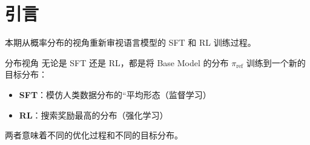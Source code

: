 \section{引言}
本期从概率分布的视角重新审视语言模型的 SFT 和 RL 训练过程。

\begin{importantbox}{分布视角}
无论是 SFT 还是 RL，都是将 Base Model 的分布 $\pi_{\text{ref}}$ 训练到一个新的目标分布：
\begin{itemize}
  \item \textbf{SFT}：模仿人类数据分布的``平均形态（监督学习）
  \item \textbf{RL}：搜索奖励最高的分布（强化学习）
\end{itemize}
两者意味着不同的优化过程和不同的目标分布。
\end{importantbox}

